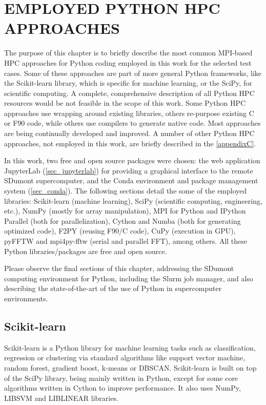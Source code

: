 \chapter{EMPLOYED PYTHON HPC APPROACHES}
\label{ch_approaches}

The purpose of this chapter is to briefly describe the most common MPI-based HPC approaches for Python coding employed in this work for the selected test cases. Some of these approaches are part of more general Python frameworks, like the Scikit-learn library, which is specific for machine learning, or the SciPy, for scientific computing. A complete, comprehensive description of all Python HPC resources would be not feasible in the scope of this work. Some Python HPC approaches use wrapping around existing libraries, others re-purpose existing C or F90 code, while others use compilers to generate native code. Most approaches are being continually developed and improved. A number of other Python HPC approaches, not employed in this work, are briefly described in the \autoref {appendixC}.

In this work, two free and open source packages were chosen: the web application JupyterLab (\autoref {sec_jupyterlab}) for providing a graphical interface to the remote SDumont supercomputer, and the Conda environment and package management system (\autoref {sec_conda}). The following sections detail the some of the employed libraries: Scikit-learn (machine learning), SciPy (scientific computing, engineering, etc.), NumPy (mostly for array manipulation), MPI for Python and IPython Parallel (both for parallelization), Cython and Numba (both for generating optimized code), F2PY (reusing F90/C code), CuPy (execution in GPU), pyFFTW and mpi4py-fftw (serial and parallel FFT), among others. All these Python libraries/packages are free and open source.

Please observe the final sections of this chapter, addressing the SDumont computing environment for Python, including the Slurm job manager, and also describing the state-of-the-art of the use of Python in supercomputer environments.  

%
%
%
\section{Scikit-learn}
\label{sec_apprsklr}

Scikit-learn \cite {Kramer2016} is a Python library for machine learning tasks such as classification, regression or clustering via standard algorithms like support vector machine, random forest, gradient boost, k-means or DBSCAN. Scikit-learn is built on top of the SciPy library, being mainly written in Python, except for some core algorithms written in Cython to improve performance. It also uses NumPy, LIBSVM and LIBLINEAR libraries.

